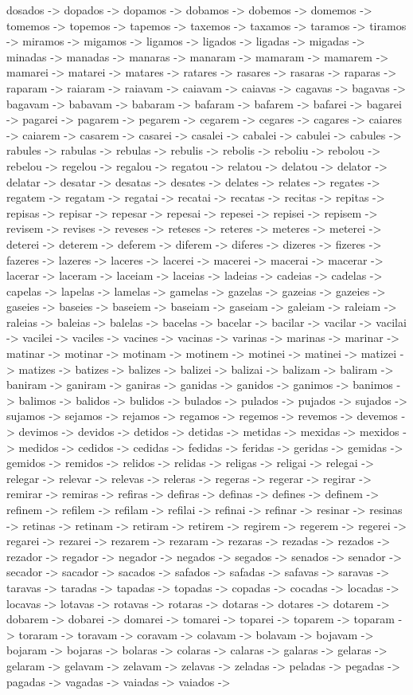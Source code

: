 \documentclass[a4paper,11pt]{article}
\begin{document}
dosados -> dopados -> dopamos -> dobamos -> dobemos -> domemos -> tomemos -> topemos -> tapemos -> taxemos -> taxamos -> taramos -> tiramos -> miramos -> migamos -> ligamos -> ligados -> ligadas -> migadas -> minadas -> manadas -> manaras -> manaram -> mamaram -> mamarem -> mamarei -> matarei -> matares -> ratares -> rasares -> rasaras -> raparas -> raparam -> raiaram -> raiavam -> caiavam -> caiavas -> cagavas -> bagavas -> bagavam -> babavam -> babaram -> bafaram -> bafarem -> bafarei -> bagarei -> pagarei -> pagarem -> pegarem -> cegarem -> cegares -> cagares -> caiares -> caiarem -> casarem -> casarei -> casalei -> cabalei -> cabulei -> cabules -> rabules -> rabulas -> rebulas -> rebulis -> rebolis -> reboliu -> rebolou -> rebelou -> regelou -> regalou -> regatou -> relatou -> delatou -> delator -> delatar -> desatar -> desatas -> desates -> delates -> relates -> regates -> regatem -> regatam -> regatai -> recatai -> recatas -> recitas -> repitas -> repisas -> repisar -> repesar -> repesai -> repesei -> repisei -> repisem -> revisem -> revises -> reveses -> reteses -> reteres -> meteres -> meterei -> deterei -> deterem -> deferem -> diferem -> diferes -> dizeres -> fizeres -> fazeres -> lazeres -> laceres -> lacerei -> macerei -> macerai -> macerar -> lacerar -> laceram -> laceiam -> laceias -> ladeias -> cadeias -> cadelas -> capelas -> lapelas -> lamelas -> gamelas -> gazelas -> gazeias -> gazeies -> gaseies -> baseies -> baseiem -> baseiam -> gaseiam -> galeiam -> raleiam -> raleias -> baleias -> balelas -> bacelas -> bacelar -> bacilar -> vacilar -> vacilai -> vacilei -> vaciles -> vacines -> vacinas -> varinas -> marinas -> marinar -> matinar -> motinar -> motinam -> motinem -> motinei -> matinei -> matizei -> matizes -> batizes -> balizes -> balizei -> balizai -> balizam -> baliram -> baniram -> ganiram -> ganiras -> ganidas -> ganidos -> ganimos -> banimos -> balimos -> balidos -> bulidos -> bulados -> pulados -> pujados -> sujados -> sujamos -> sejamos -> rejamos -> regamos -> regemos -> revemos -> devemos -> devimos -> devidos -> detidos -> detidas -> metidas -> mexidas -> mexidos -> medidos -> cedidos -> cedidas -> fedidas -> feridas -> geridas -> gemidas -> gemidos -> remidos -> relidos -> relidas -> religas -> religai -> relegai -> relegar -> relevar -> relevas -> releras -> regeras -> regerar -> regirar -> remirar -> remiras -> refiras -> defiras -> definas -> defines -> definem -> refinem -> refilem -> refilam -> refilai -> refinai -> refinar -> resinar -> resinas -> retinas -> retinam -> retiram -> retirem -> regirem -> regerem -> regerei -> regarei -> rezarei -> rezarem -> rezaram -> rezaras -> rezadas -> rezados -> rezador -> regador -> negador -> negados -> segados -> senados -> senador -> secador -> sacador -> sacados -> safados -> safadas -> safavas -> saravas -> taravas -> taradas -> tapadas -> topadas -> copadas -> cocadas -> locadas -> locavas -> lotavas -> rotavas -> rotaras -> dotaras -> dotares -> dotarem -> dobarem -> dobarei -> domarei -> tomarei -> toparei -> toparem -> toparam -> toraram -> toravam -> coravam -> colavam -> bolavam -> bojavam -> bojaram -> bojaras -> bolaras -> colaras -> calaras -> galaras -> gelaras -> gelaram -> gelavam -> zelavam -> zelavas -> zeladas -> peladas -> pegadas -> pagadas -> vagadas -> vaiadas -> vaiados -> 
\end{document}
